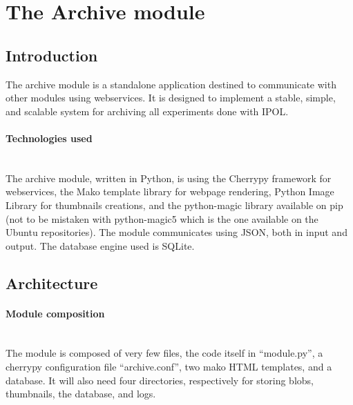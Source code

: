 \section{The Archive module}
\label{sec:archive}


\subsection{Introduction}
\label{sec:archive_introduction}

The archive module is a standalone application destined to communicate with other modules using webservices. It is designed to implement a stable, simple, and scalable system for archiving all experiments done with IPOL.

\paragraph{Technologies used} \hspace{0pt} \\
The archive module, written in Python, is using the Cherrypy framework for webservices, the Mako template library for webpage rendering, Python Image Library for thumbnails creations, and the python-magic library available on pip (not to be mistaken with python-magic5 which is the one available on the Ubuntu repositories). The module communicates using JSON, both in input and output. The database engine used is SQLite.

\subsection{Architecture}

\paragraph{Module composition} \hspace{0pt} \\
The module is composed of very few files, the code itself in ``module.py'', a cherrypy configuration file ``archive.conf'', two mako HTML templates, and a database. It will also need four directories, respectively for storing blobs, thumbnails, the database, and logs.

